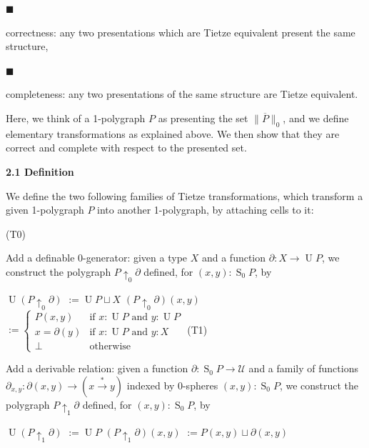 \par\noindent  $\blacksquare$ 
 
correctness: any two presentations which are Tietze equivalent present the same structure,\par
 
 
 
\par\noindent  $\blacksquare$ 
 
completeness: any two presentations of the same structure are Tietze equivalent.\par
 
 
  
Here, we think of a 1-polygraph $P$ as presenting the set $\|\overline{P}\|_{0}$, and we define elementary transformations as explained above. We then show that they are correct and complete with respect to the presented set.\par
 
 
 
\par\medskip\noindent\textbf{2.1 Definition}\par
 
 
We define the two following families of Tietze transformations, which transform a given 1-polygraph $P$ into another 1-polygraph, by attaching cells to it:\par
  (T0)  
 
Add a definable 0-generator: given a type $X$ and a function $\partial:X\to\operatorname{U}P$, we construct the polygraph $P{\uparrow_{0}}\partial$ defined, for $(x,y):\operatorname{S}_{0}P$, by\par
    $\displaystyle\operatorname{U}(P{\uparrow_{0}}\partial)$ $\displaystyle:=\operatorname{U}P\sqcup X$ $\displaystyle(P{\uparrow_{0}}\partial)(x,y)$ $\displaystyle:=\begin{cases}P(x,y)&\text{if $x:\operatorname{U}P$ and $y:\operatorname{U}P$}\\
x=\partial(y)&\text{if $x:\operatorname{U}P$ and $y:X$}\\
\bot&\text{otherwise}\end{cases}$    
  (T1)  
 
Add a derivable relation: given a function $\partial:\operatorname{S}_{0}P\to\mathcal{U}$ and a family of functions $\partial_{x,y}:\partial(x,y)\to(x\overset{*}{\to}y)$ indexed by 0-spheres $(x,y):\operatorname{S}_{0}P$, we construct the polygraph $P{\uparrow_{1}}\partial$ defined, for $(x,y):\operatorname{S}_{0}P$, by\par
    $\displaystyle\operatorname{U}(P{\uparrow_{1}}\partial)$ $\displaystyle:=\operatorname{U}P$ $\displaystyle(P{\uparrow_{1}}\partial)(x,y)$ $\displaystyle:=P(x,y)\sqcup\partial(x,y)$    
   
